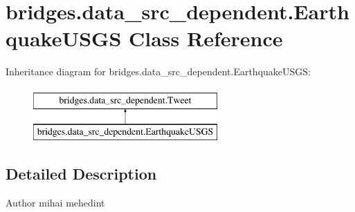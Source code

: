 \hypertarget{classbridges_1_1data__src__dependent_1_1_earthquake_u_s_g_s}{}\section{bridges.\+data\+\_\+src\+\_\+dependent.\+Earthquake\+U\+S\+GS Class Reference}
\label{classbridges_1_1data__src__dependent_1_1_earthquake_u_s_g_s}
Inheritance diagram for bridges.\+data\+\_\+src\+\_\+dependent.\+Earthquake\+U\+S\+GS\+:\begin{figure}[H]
\begin{center}
\leavevmode
\includegraphics[height=2.000000cm]{classbridges_1_1data__src__dependent_1_1_earthquake_u_s_g_s}
\end{center}
\end{figure}


\subsection{Detailed Description}
\begin{DoxyAuthor}{Author}
mihai mehedint 
\end{DoxyAuthor}
